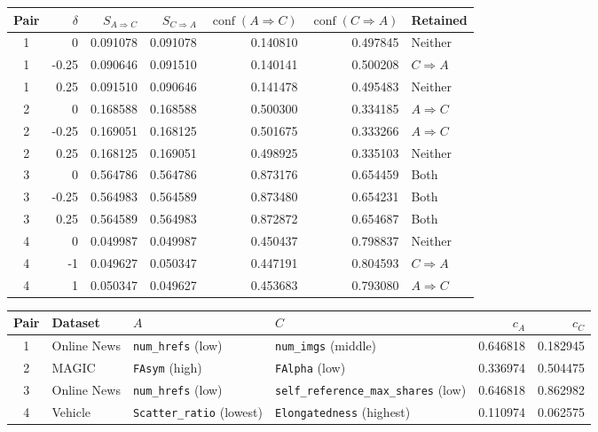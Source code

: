 \begin{table}
\label{tab:matched-examples}
\begin{tabular}{crrrrrl}
\toprule
Pair & $\delta$ & $S_{A\Rightarrow C}$ & $S_{C\Rightarrow A}$ & $\operatorname{conf}(A\Rightarrow C)$ & $\operatorname{conf}(C\Rightarrow A)$ & Retained \\
\midrule
1 & 0 & 0.091078 & 0.091078 & 0.140810 & 0.497845 & Neither \\
1 & -0.25 & 0.090646 & 0.091510 & 0.140141 & 0.500208 & $C\Rightarrow A$ \\
1 & 0.25 & 0.091510 & 0.090646 & 0.141478 & 0.495483 & Neither \\
2 & 0 & 0.168588 & 0.168588 & 0.500300 & 0.334185 & $A\Rightarrow C$ \\
2 & -0.25 & 0.169051 & 0.168125 & 0.501675 & 0.333266 & $A\Rightarrow C$ \\
2 & 0.25 & 0.168125 & 0.169051 & 0.498925 & 0.335103 & Neither \\
3 & 0 & 0.564786 & 0.564786 & 0.873176 & 0.654459 & Both \\
3 & -0.25 & 0.564983 & 0.564589 & 0.873480 & 0.654231 & Both \\
3 & 0.25 & 0.564589 & 0.564983 & 0.872872 & 0.654687 & Both \\
4 & 0 & 0.049987 & 0.049987 & 0.450437 & 0.798837 & Neither \\
4 & -1 & 0.049627 & 0.050347 & 0.447191 & 0.804593 & $C\Rightarrow A$ \\
4 & 1 & 0.050347 & 0.049627 & 0.453683 & 0.793080 & $A\Rightarrow C$ \\
\bottomrule
\end{tabular}
\begin{tabular}{clllrr}
\toprule
Pair & Dataset & $A$ & $C$ & $c_A$ & $c_C$ \\
\midrule
1 & Online News & \texttt{num\_hrefs} (low) & \texttt{num\_imgs} (middle) & 0.646818 & 0.182945 \\
2 & MAGIC & \texttt{FAsym} (high) & \texttt{FAlpha} (low) & 0.336974 & 0.504475 \\
3 & Online News & \texttt{num\_hrefs} (low) & \texttt{self\_reference\_max\_shares} (low) & 0.646818 & 0.862982 \\
4 & Vehicle & \texttt{Scatter\_ratio} (lowest) & \texttt{Elongatedness} (highest) & 0.110974 & 0.062575 \\
\bottomrule
\end{tabular}
\end{table}

